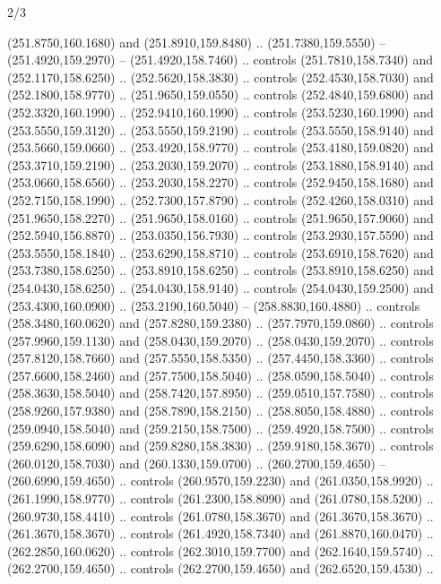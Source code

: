 \begin{flagdescription}{2/3}
\begin{scope}[xshift=0.5\flaglength,yshift=0.5\flagwidth,scale=\flagwidth/259.2]
\begin{scope}[y=0.8pt, x=0.8pt, yscale=-1,shift={(-243,-162)}]
      (251.8750,160.1680) and (251.8910,159.8480) .. (251.7380,159.5550) --
      (251.4920,159.2970) -- (251.4920,158.7460) .. controls (251.7810,158.7340) and
      (252.1170,158.6250) .. (252.5620,158.3830) .. controls (252.4530,158.7030) and
      (252.1800,158.9770) .. (251.9650,159.0550) .. controls (252.4840,159.6800) and
      (252.3320,160.1990) .. (252.9410,160.1990) .. controls (253.5230,160.1990) and
      (253.5550,159.3120) .. (253.5550,159.2190) .. controls (253.5550,158.9140) and
      (253.5660,159.0660) .. (253.4920,158.9770) .. controls (253.4180,159.0820) and
      (253.3710,159.2190) .. (253.2030,159.2070) .. controls (253.1880,158.9140) and
      (253.0660,158.6560) .. (253.2030,158.2270) .. controls (252.9450,158.1680) and
      (252.7150,158.1990) .. (252.7300,157.8790) .. controls (252.4260,158.0310) and
      (251.9650,158.2270) .. (251.9650,158.0160) .. controls (251.9650,157.9060) and
      (252.5940,156.8870) .. (253.0350,156.7930) .. controls (253.2930,157.5590) and
      (253.5550,158.1840) .. (253.6290,158.8710) .. controls (253.6910,158.7620) and
      (253.7380,158.6250) .. (253.8910,158.6250) .. controls (253.8910,158.6250) and
      (254.0430,158.6250) .. (254.0430,158.9140) .. controls (254.0430,159.2500) and
      (253.4300,160.0900) .. (253.2190,160.5040) -- (258.8830,160.4880) .. controls
      (258.3480,160.0620) and (257.8280,159.2380) .. (257.7970,159.0860) .. controls
      (257.9960,159.1130) and (258.0430,159.2070) .. (258.0430,159.2070) .. controls
      (257.8120,158.7660) and (257.5550,158.5350) .. (257.4450,158.3360) .. controls
      (257.6600,158.2460) and (257.7500,158.5040) .. (258.0590,158.5040) .. controls
      (258.3630,158.5040) and (258.7420,157.8950) .. (259.0510,157.7580) .. controls
      (258.9260,157.9380) and (258.7890,158.2150) .. (258.8050,158.4880) .. controls
      (259.0940,158.5040) and (259.2150,158.7500) .. (259.4920,158.7500) .. controls
      (259.6290,158.6090) and (259.8280,158.3830) .. (259.9180,158.3670) .. controls
      (260.0120,158.7030) and (260.1330,159.0700) .. (260.2700,159.4650) --
      (260.6990,159.4650) .. controls (260.9570,159.2230) and (261.0350,158.9920) ..
      (261.1990,158.9770) .. controls (261.2300,158.8090) and (261.0780,158.5200) ..
      (260.9730,158.4410) .. controls (261.0780,158.3670) and (261.3670,158.3670) ..
      (261.3670,158.3670) .. controls (261.4920,158.7340) and (261.8870,160.0470) ..
      (262.2850,160.0620) .. controls (262.3010,159.7700) and (262.1640,159.5740) ..
      (262.2700,159.4650) .. controls (262.2700,159.4650) and (262.6520,159.4530) ..

\end{scope}
\end{scope}
\end{flagdescription}
